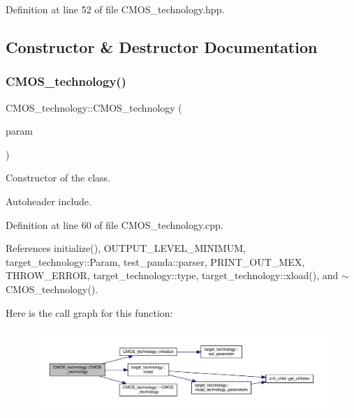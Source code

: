 Definition at line 52 of file C\+M\+O\+S\+\_\+technology.\+hpp.



\subsection{Constructor \& Destructor Documentation}
\mbox{\label{classCMOS__technology_a006a80a23d6486f8d35c5b0113044ee7}} 
\subsubsection{\texorpdfstring{C\+M\+O\+S\+\_\+technology()}{CMOS\_technology()}}
{\footnotesize\ttfamily C\+M\+O\+S\+\_\+technology\+::\+C\+M\+O\+S\+\_\+technology (\begin{DoxyParamCaption}\item[{const \hyperlink{Parameter_8hpp_a37841774a6fcb479b597fdf8955eb4ea}{Parameter\+Const\+Ref} \&}]{param }\end{DoxyParamCaption})\hspace{0.3cm}{\ttfamily [explicit]}}



Constructor of the class. 

Autoheader include. 

Definition at line 60 of file C\+M\+O\+S\+\_\+technology.\+cpp.



References initialize(), O\+U\+T\+P\+U\+T\+\_\+\+L\+E\+V\+E\+L\+\_\+\+M\+I\+N\+I\+M\+UM, target\+\_\+technology\+::\+Param, test\+\_\+panda\+::parser, P\+R\+I\+N\+T\+\_\+\+O\+U\+T\+\_\+\+M\+EX, T\+H\+R\+O\+W\+\_\+\+E\+R\+R\+OR, target\+\_\+technology\+::type, target\+\_\+technology\+::xload(), and $\sim$\+C\+M\+O\+S\+\_\+technology().

Here is the call graph for this function\+:
\nopagebreak
\begin{figure}[H]
\begin{center}
\leavevmode
\includegraphics[width=350pt]{de/da2/classCMOS__technology_a006a80a23d6486f8d35c5b0113044ee7_cgraph}
\end{center}
\end{figure}
\mbox{\label{classCMOS__technology_aac71ba52c2e5fd3a0883366b603fc375}} 
